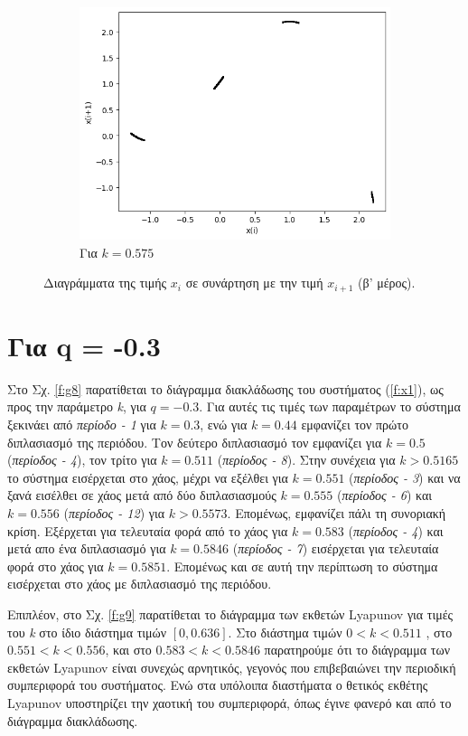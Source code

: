 \begin{figure}[ht]
\begin{subfigure}[c]{0.4\textwidth}
		\includegraphics[width=\textwidth]{LateX images/graphs/k0575}
		\caption{Για $k=0.575$}
		\label{f:k14}
	\end{subfigure}
	\caption{Διαγράμματα της τιμής \(x_i\) σε συνάρτηση με την τιμή \(x_{i+1}\) (β' μέρος).}
\end{figure}
\vfill
\clearpage
\newpage
\section{Για q = -0.3}

Στο Σχ. \ref{f:g8} παρατίθεται το διάγραμμα διακλάδωσης του συστήματος (\ref{f:x1}), ως προς την παράμετρο \emph{k}, για $q =-0.3$. Για αυτές τις τιμές των παραμέτρων το σύστημα ξεκινάει από \emph{περίοδο - 1} για $k=0.3$, ενώ για  $k = 0.44$ εμφανίζει τον πρώτο διπλασιασμό της περιόδου. Τον δεύτερο διπλασιασμό τον εμφανίζει για $k=0.5$ (\emph{περίοδος -   4}), τον τρίτο για $k=0.511$ (\emph{περίοδος -   8}). Στην συνέχεια για $k>0.5165$ το σύστημα εισέρχεται στο χάος, μέχρι να εξέλθει  για $k=0.551$ (\emph{περίοδος -   3}) και να ξανά εισέλθει σε χάος μετά από δύο διπλασιασμούς $k=0.555$ (\emph{περίοδος - 6}) και $k=0.556$ (\emph{περίοδος - 12}) για $k>0.5573$. Επομένως, εμφανίζει πάλι τη συνοριακή κρίση. Εξέρχεται για τελευταία φορά από το χάος για $k=0.583$ (\emph{περίοδος - 4}) και μετά απο ένα διπλασιασμό  για $k=0.5846$ (\emph{περίοδος - 7}) εισέρχεται για τελευταία φορά στο χάος για $k=0.5851$.
Επομένως και σε αυτή την περίπτωση το σύστημα εισέρχεται στο χάος με διπλασιασμό της περιόδου. 

Επιπλέον, στο Σχ. \ref{f:g9} παρατίθεται το διάγραμμα των εκθετών Lyapunov για τιμές του \emph{k} στο ίδιο διάστημα τιμών $[0, 0.636]$. Στο διάστημα τιμών   $0<k<0.511$ , στο $0.551<k<0.556$, και στο $0.583<k<0.5846$ παρατηρούμε ότι το διάγραμμα των εκθετών Lyapunov είναι συνεχώς αρνητικός, γεγονός που επιβεβαιώνει την περιοδική συμπεριφορά του συστήματος. Ενώ στα υπόλοιπα διαστήματα ο θετικός εκθέτης Lyapunov υποστηρίζει την χαοτική του συμπεριφορά, όπως έγινε φανερό και από το διάγραμμα διακλάδωσης.

